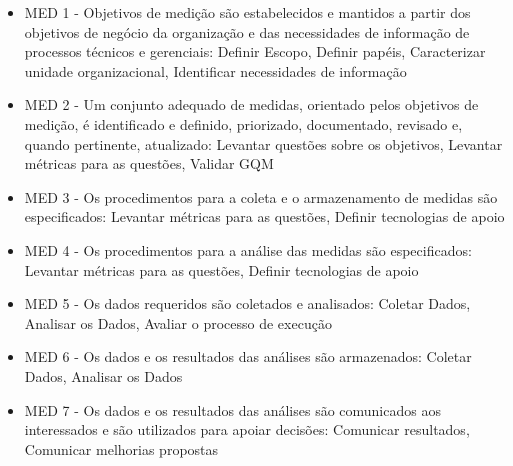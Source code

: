 \begin{itemize}
\item MED 1 - Objetivos   de  medição   são   estabelecidos   e  mantidos  a  partir   dos 
objetivos   de   negócio   da   organização   e   das   necessidades   de informação de processos técnicos e gerenciais: Definir Escopo, Definir papéis, Caracterizar unidade organizacional, Identificar necessidades de informação
\item MED 2 - Um  conjunto  adequado  de  medidas,  orientado  pelos  objetivos  de medição,  é  identificado  e  definido,  priorizado,  documentado,  revisado 
e, quando pertinente, atualizado: Levantar questões sobre os objetivos, Levantar métricas para as questões, Validar GQM
\item MED 3 - Os  procedimentos  para  a  coleta  e  o  armazenamento  de  medidas  são especificados: Levantar métricas para as questões,  Definir tecnologias de apoio
\item MED 4 - Os procedimentos para a análise das medidas são especificados: Levantar métricas para as questões, Definir tecnologias de apoio
\item MED 5 - Os dados requeridos são coletados e analisados: Coletar Dados, Analisar os Dados, Avaliar o processo de execução
\item MED 6 - Os dados e os resultados das análises são armazenados: Coletar Dados, Analisar os Dados
\item MED 7 - Os   dados   e   os   resultados   das   análises   são   comunicados   aos interessados e são utilizados para apoiar decisões: Comunicar resultados, Comunicar melhorias propostas

\end{itemize}